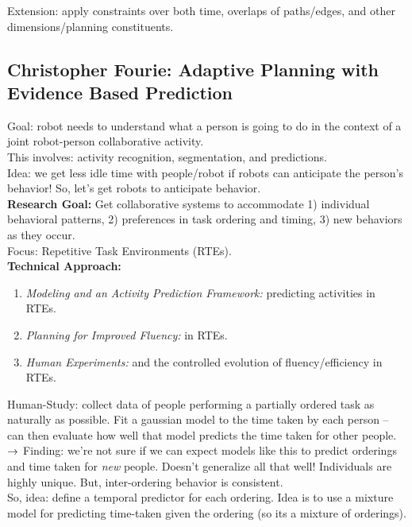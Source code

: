 Extension: apply constraints over both time, overlaps of paths/edges, and other dimensions/planning constituents.

\spacerule
\subsection{Christopher Fourie: Adaptive Planning with Evidence Based Prediction}

Goal: robot needs to understand what a person is going to do in the context of a joint robot-person collaborative activity. \\

This involves: activity recognition, segmentation, and predictions. \\

Idea: we get less idle time with people/robot if robots can anticipate the person's behavior! So, let's get robots to anticipate behavior. \\

{\bf Research Goal:} Get collaborative systems to accommodate 1) individual behavioral patterns, 2) preferences in task ordering and timing, 3) new behaviors as they occur. \\

Focus: Repetitive Task Environments (RTEs). \\

{\bf Technical Approach:}
\begin{enumerate}
    \item {\it Modeling and an Activity Prediction Framework:} predicting activities in RTEs.
    \item {\it Planning for Improved Fluency:} in RTEs.
    \item {\it Human Experiments:} and the controlled evolution of fluency/efficiency in RTEs.
\end{enumerate}

Human-Study: collect data of people performing a partially ordered task as naturally as possible. Fit a gaussian model to the time taken by each person -- can then evaluate how well that model predicts the time taken for other people. \\

$\rightarrow$ Finding: we're not sure if we can expect models like this to predict orderings and time taken for {\it new} people. Doesn't generalize all that well! Individuals are highly unique. But, inter-ordering behavior is consistent. \\

So, idea: define a temporal predictor for each ordering. Idea is to use a mixture model for predicting time-taken given the ordering (so its a mixture of orderings). \\

